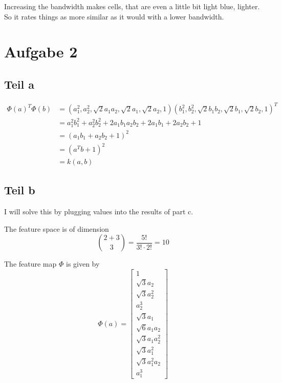 \documentclass[10pt,a4paper]{article}
\begin{document}
Increasing the bandwidth makes cells, that are even a little bit light blue,
lighter. So it rates things as more similar as it would with a lower bandwidth.

\section{Aufgabe 2}

\subsection{Teil a}

\begin{align*}
  \Phi(a)^{T}\Phi(b) & = (a_{1}^{2}, a_{2}^{2}, \sqrt{2}a_{1}a_{2}, \sqrt{2}a_{1}, \sqrt{2}a_{2}, 1)(b_{1}^{2}, b_{2}^{2}, \sqrt{2}b_{1}b_{2}, \sqrt{2}b_{1}, \sqrt{2}b_{2}, 1)^{T}\\
                     & = a_{1}^{2}b_{1}^{2} + a_{2}^{2}b_{2}^{2} + 2a_{1}b_{1}a_{2}b_{2} + 2 a_{1}b_{1} + 2 a_{2}b_{2} + 1\\
                     & = (a_{1}b_{1} + a_{2}b_{2} + 1)^{2}\\
                     & = (a^{T}b + 1)^{2}\\
                     & = k(a, b)
\end{align*}

\subsection{Teil b}

I will solve this by plugging values into the results of part c.

The feature space is of dimension
\begin{equation}
  \binom{2 + 3}{3} = \frac{5!}{3! \cdot 2!} = 10
\end{equation}

The feature map $\Phi$ is given by
\begin{equation}
  \Phi(a) = \begin{bmatrix}
    1\\
    \sqrt{3} a_{2}\\
    \sqrt{3} a_{2}^{2}\\
    a_{2}^{3}\\
    \sqrt{3} a_{1}\\
    \sqrt{6} a_{1} a_{2}\\
    \sqrt{3} a_{1} a_{2}^{2}\\
    \sqrt{3} a_{1}^{2}\\
    \sqrt{3} a_{1}^{2} a_{2}\\
    a_{1}^{3}
  \end{bmatrix}
\end{equation}
\end{document}

